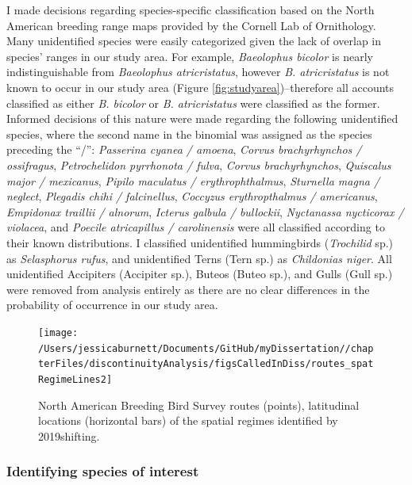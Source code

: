 \documentclass[12pt,twoside,openany]{reedthesis}
\begin{document}
I made decisions regarding species-specific classification based on the North American breeding range maps provided by the Cornell Lab of Ornithology. Many unidentified species were easily categorized given the lack of overlap in species' ranges in our study area. For example, \emph{Baeolophus bicolor} is nearly indistinguishable from \emph{Baeolophus atricristatus}, however \emph{B. atricristatus} is not known to occur in our study area (Figure \ref{fig:studyarea})--therefore all accounts classified as either \emph{B. bicolor} or \emph{B. atricristatus} were classified as the former. Informed decisions of this nature were made regarding the following unidentified species, where the second name in the binomial was assigned as the species preceding the ``/'': \emph{Passerina cyanea / amoena}, \emph{Corvus brachyrhynchos / ossifragus}, \emph{Petrochelidon pyrrhonota / fulva}, \emph{Corvus brachyrhynchos}, \emph{Quiscalus major / mexicanus}, \emph{Pipilo maculatus / erythrophthalmus}, \emph{Sturnella magna / neglect}, \emph{Plegadis chihi / falcinellus}, \emph{Coccyzus erythropthalmus / americanus}, \emph{Empidonax traillii / alnorum}, \emph{Icterus galbula / bullockii}, \emph{Nyctanassa nycticorax / violacea}, and \emph{Poecile atricapillus / carolinensis} were all classified according to their known distributions. I classified unidentified hummingbirds (\emph{Trochilid} sp.) as \emph{Selasphorus rufus}, and unidentified Terns (Tern sp.) as \emph{Childonias niger}. All unidentified Accipiters (Accipiter sp.), Buteos (Buteo sp.), and Gulls (Gull sp.) were removed from analysis entirely as there are no clear differences in the probability of occurrence in our study area.
\begin{figure}[bth]

{\centering \texttt{[image: /Users/jessicaburnett/Documents/GitHub/myDissertation//chapterFiles/discontinuityAnalysis/figsCalledInDiss/routes\_spatRegimeLines2]} 

}

\caption{North American Breeding Bird Survey routes (points), latitudinal locations (horizontal bars) of the spatial regimes identified by \@roberts2019shifting.}\label{fig:routesWithSpatRegimes}
\end{figure}
\hypertarget{identifying-species-of-interest}{%
\subsubsection{Identifying species of interest}\label{identifying-species-of-interest}}
\end{document}
